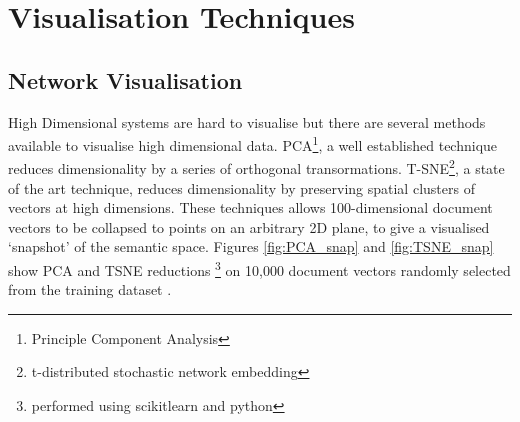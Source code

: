 \section{Visualisation Techniques}
\subsection{Network Visualisation}
High Dimensional systems are hard to visualise but there are several methods available to visualise high dimensional data. PCA\footnote{Principle Component Analysis}\cite{PCA}, a well established technique reduces dimensionality by a series of orthogonal transormations. T-SNE\footnote{t-distributed stochastic network embedding }, a state of the art technique, reduces dimensionality by preserving spatial clusters of vectors at high dimensions\cite{TSNE}. These techniques allows 100-dimensional document vectors to be collapsed to points on an arbitrary 2D plane, to give a visualised `snapshot' of the semantic space. 
Figures \ref{fig:PCA_snap} and \ref{fig:TSNE_snap} show PCA and TSNE reductions \footnote{performed using scikitlearn and python} on 10,000 document vectors randomly selected from the training dataset \cite{scikitlearn}.

